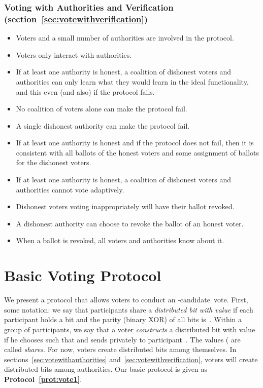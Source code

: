 \documentclass[runningheads]{llncs}
\begin{document}
\subsubsection{Voting with Authorities and Verification (section~\ref{sec:votewithverification})}
\begin{itemize}
\item Voters and a small number of authorities are involved in the protocol.
\item Voters only interact with authorities.
\item If at least one authority is honest, a coalition of dishonest voters and authorities
can only learn
what they would learn in the ideal functionality, and this even (and
also) if the protocol fails.
\item No coalition of voters alone can make the protocol fail.
\item A single dishonest authority can make the protocol fail.
\item If at least one authority is honest and if the protocol does not fail, then
it is consistent with all ballots of the honest voters and some
assignment of ballots for the dishonest voters.
\item If at least one authority is honest, a coalition of dishonest voters and authorities cannot vote adaptively.
\item Dishonest voters voting inappropriately will have their ballot revoked.
\item A dishonest authority can choose to revoke the ballot of an honest voter.
\item When a ballot is revoked, all voters and authorities know
about it.
\end{itemize}

\section{Basic Voting Protocol}
\label{sec:vote}

We present a protocol that allows  voters to conduct an
-candidate~vote. First, some notation: we say that participants
share a \emph{distributed bit with value } if each participant
holds a bit and the parity (binary XOR) of all bits is~. Within a
group of  participants, we say that a voter \emph{constructs} a
distributed bit with value~ if he chooses  such
that  and  sends privately  to
participant~. The values  ( are called
\emph{shares}.  For now, voters create distributed bits among
themselves. In sections~\ref{sec:votewithauthorities}
and~\ref{sec:votewithverification},  voters will create distributed
bits among authorities. Our basic protocol is given as
\textbf{Protocol~\ref{prot:vote1}}.
\end{document}
